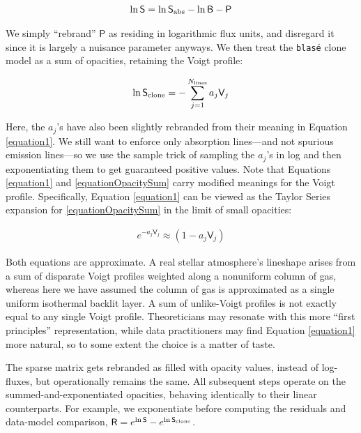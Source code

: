 \documentclass[modern]{aastex631}
\begin{document}
\begin{eqnarray}
    \ln{\mathsf{S}} = \ln{\mathsf{S}_{\rm abs}} - \ln{\mathsf{B}} - \mathsf{P}
    \label{eqnlogFlat}
\end{eqnarray}

We simply ``rebrand'' $\mathsf{P}$ as residing in logarithmic flux units, and disregard it since it is largely a nuisance parameter anyways.  We then treat the \texttt{blas\'e} clone model as a sum of opacities, retaining the Voigt profile:

\begin{eqnarray}
    \ln{\mathsf{S}_{\rm clone}} = -\sum_{j=1}^{N_{\mathrm{lines}}} a_j \mathsf{V}_j \label{equationOpacitySum}
\end{eqnarray}

Here, the $a_j$'s have also been slightly rebranded from their meaning in Equation \ref{equation1}.  We still want to enforce only absorption lines---and not spurious emission lines---so we use the sample trick of sampling the $a_j$'s in log and then exponentiating them to get guaranteed positive values.  Note that Equations \ref{equation1} and \ref{equationOpacitySum} carry modified meanings for the Voigt profile.  Specifically, Equation \ref{equation1} can be viewed as the Taylor Series expansion for \ref{equationOpacitySum} in the limit of small opacities:

\begin{eqnarray}
    e^{-a_j \mathsf{V}_j} \approx (1-a_j\mathsf{V}_j) \label{eqnTaylor}
\end{eqnarray}

Both equations are approximate. A real stellar atmosphere's lineshape arises from a sum of disparate Voigt profiles weighted along a nonuniform column of gas, whereas here we have assumed the column of gas is approximated as a single uniform isothermal backlit layer.  A sum of unlike-Voigt profiles is not exactly equal to any single Voigt profile.  Theoreticians may resonate with this more ``first principles'' representation, while data practitioners may find Equation \ref{equation1} more natural, so to some extent the choice is a matter of taste.

The sparse matrix gets rebranded as filled with opacity values, instead of log-fluxes, but operationally remains the same. All subsequent steps operate on the summed-and-exponentiated opacities, behaving identically to their linear counterparts.  For example, we exponentiate before computing the residuals and data-model comparison, $\mathsf{R} = e^{\ln{\mathsf{S}}} - e^{\ln{\mathsf{S}_{\rm clone}}}$.
\end{document}
